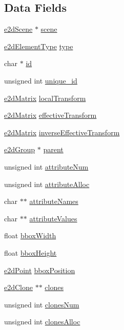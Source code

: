 \subsection*{Data Fields}
\begin{DoxyCompactItemize}
\item 
\hyperlink{structe2dScene}{e2d\-Scene} $\ast$ \hyperlink{structe2dElement_a0ebd8fae058dd45496c86a2ca317ca9c}{scene}
\item 
\hyperlink{group__e2dElement_ga9bc8cfdec08c7e9069fc707ee456fd38}{e2d\-Element\-Type} \hyperlink{structe2dElement_a7df43d7f6c23b61b843acb56eb3ca19a}{type}
\item 
char $\ast$ \hyperlink{structe2dElement_aecb3b0d045ada529257a2fbf8f829599}{id}
\item 
unsigned int \hyperlink{structe2dElement_a300bb6cf5b184e200523e9bce8346dc4}{unique\-\_\-id}
\item 
\hyperlink{structe2dMatrix}{e2d\-Matrix} \hyperlink{structe2dElement_a52bda732df714953f93c1e6f5f7c7c93}{local\-Transform}
\item 
\hyperlink{structe2dMatrix}{e2d\-Matrix} \hyperlink{structe2dElement_a6c8e26945f09b5157e2111e42f99b879}{effective\-Transform}
\item 
\hyperlink{structe2dMatrix}{e2d\-Matrix} \hyperlink{structe2dElement_a5e6d7341f2dbef1923b0a3fcc13781c6}{inverse\-Effective\-Transform}
\item 
\hyperlink{structe2dGroup}{e2d\-Group} $\ast$ \hyperlink{structe2dElement_a3e62eb2fbf1d6bc6d6fe549096a6cee9}{parent}
\item 
unsigned int \hyperlink{structe2dElement_a836181401227a3ca42da026a8d35e730}{attribute\-Num}
\item 
unsigned int \hyperlink{structe2dElement_a70d94929e3789bf7c019c939b0084985}{attribute\-Alloc}
\item 
char $\ast$$\ast$ \hyperlink{structe2dElement_af9b5d9dbbf270b6f92a3ee66ce1b47ac}{attribute\-Names}
\item 
char $\ast$$\ast$ \hyperlink{structe2dElement_ae8591ff93c366b4d66817a70f2d9f33e}{attribute\-Values}
\item 
float \hyperlink{structe2dElement_a6a1d9b223870deeaec7f5e8b23ca4b22}{bbox\-Width}
\item 
float \hyperlink{structe2dElement_a680d0d4219ac8720005c46b55a9676ae}{bbox\-Height}
\item 
\hyperlink{structe2dPoint}{e2d\-Point} \hyperlink{structe2dElement_ac2c17ce4cba805b594b314a77923cbf5}{bbox\-Position}
\item 
\hyperlink{structe2dClone}{e2d\-Clone} $\ast$$\ast$ \hyperlink{structe2dElement_a4347bc7eb8d31d574115ef75ae074bb7}{clones}
\item 
unsigned int \hyperlink{structe2dElement_ab4c733639f1fdab67f8d25a1439a8b1a}{clones\-Num}
\item 
unsigned int \hyperlink{structe2dElement_a4bdf6d903ed95cd67debbba1ef3dbdae}{clones\-Alloc}
\end{DoxyCompactItemize}


